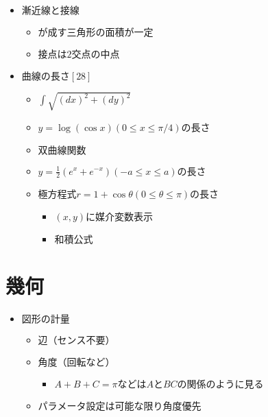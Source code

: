 \documentclass[dvipdfmx,uplatex]{jsarticle}
\begin{document}
\begin{itemize}
\begin{itemize}
\begin{itemize}
		\end{itemize}
	\end{itemize}
	\item $ 漸近線と接線$
	\begin{itemize}
		\item $ が成す三角形の面積が一定$
		\item $ 接点は2交点の中点$
	\end{itemize}
	\item $ 曲線の長さ[28]$
	\begin{itemize}
		\item $ \int \sqrt{(dx)^2 + (dy)^2}$
		\item $ y= \log ( \cos x) (0 \leq x \leq \pi / 4)の長さ$
		\item $ 双曲線関数$
		\item $ y = \frac{1}{2}(e^x + e^{-x})(-a \leq x \leq a)の長さ$
		\item $ 極方程式r=1+ \cos \theta (0 \leq \theta \leq \pi)の長さ$
		\begin{itemize}
			\item $(x,y)に媒介変数表示$
			\item $和積公式$
		\end{itemize}
	\end{itemize}
\end{itemize}

\section{幾何}
\begin{itemize}
	\item $ 図形の計量$
	\begin{itemize}
		\item $ 辺（センス不要）$
		\item $ 角度（回転など）$
		\begin{itemize}
			\item $ A+B+C= \pi などはAとBCの関係のように見る$
		\end{itemize}
		\item $ パラメータ設定は可能な限り角度優先$
	\end{itemize}
\end{itemize}
\end{document}
